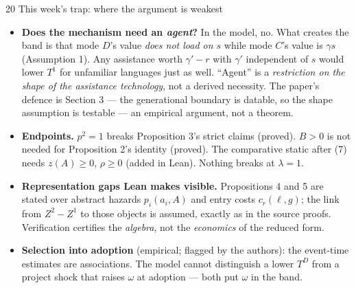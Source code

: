 \documentclass[aspectratio=169,11pt]{beamer}
\begin{document}
\begin{frame}{20 \textperiodcentered{} This week's trap: where the argument is weakest}
  \begin{itemize}\footnotesize
    \item \textbf{Does the mechanism need an \emph{agent}?} In the model, no. What creates the band is
      that mode $D$'s value \emph{does not load on $s$} while mode $C$'s value is $\gamma s$
      (Assumption 1). Any assistance worth $\gamma'-r$ with $\gamma'$ independent of $s$ would lower
      $T^1$ for unfamiliar languages just as well. ``Agent'' is a \emph{restriction on the shape of the
      assistance technology}, not a derived necessity. The paper's defence is Section 3 --- the
      generational boundary is datable, so the shape assumption is testable --- an empirical argument,
      not a theorem.
    \item \textbf{Endpoints.} $p^2=1$ breaks Proposition 3's strict claims (proved). $B>0$ is not
      needed for Proposition 2's identity (proved). The comparative static after (7) needs
      $z(A)\ge 0$, $\rho\ge 0$ (added in Lean). Nothing breaks at $\lambda=1$.
    \item \textbf{Representation gaps Lean makes visible.} Propositions 4 and 5 are stated over
      abstract hazards $p_i(a_i,A)$ and entry costs $c_r(\ell,g)$; the link from $Z^2-Z^1$ to those
      objects is assumed, exactly as in the source proofs. Verification certifies the \emph{algebra},
      not the \emph{economics} of the reduced form.
    \item \textbf{Selection into adoption} (empirical; flagged by the authors): the event-time estimates
      are associations. The model cannot distinguish a lower $T^D$ from a project shock that raises
      $\omega$ at adoption --- both put $\omega$ in the band.
  \end{itemize}
\end{frame}
\end{document}
